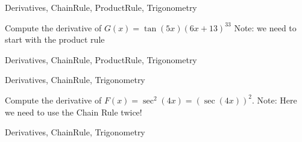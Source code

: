 

	
\begin{tagblock}{Derivatives, ChainRule, ProductRule, Trigonometry}
\begin{question}
	

Compute the derivative of $G(x) = \tan(5x)(6x+13)^{33}$  Note: we need to start with the product rule


	
\begin{tags}
	    Derivatives, ChainRule, ProductRule, Trigonometry
\end{tags}
	
\begin{diary}
\end{diary}
	
\begin{solution}
	   
\end{solution}
	
\end{question}

\end{tagblock}



	
\begin{tagblock}{Derivatives, ChainRule, Trigonometry}
\begin{question}
	

Compute the derivative of $F(x) = \sec^2(4x) = (\sec(4x))^2$.  Note: Here we need to use the Chain Rule twice! 


	
\begin{tags}
	    Derivatives, ChainRule, Trigonometry
\end{tags}
	
\begin{diary}
\end{diary}
	
\begin{solution}
	   
\end{solution}
	
\end{question}

\end{tagblock}


